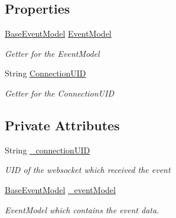 \subsection*{Properties}
\begin{DoxyCompactItemize}
\item 
\hyperlink{class_web_analyzer_1_1_models_1_1_event_model_1_1_base_event_model}{Base\+Event\+Model} \hyperlink{class_web_analyzer_1_1_events_1_1_add_browser_event_a4b3076f3d60100e7342be4da00a907fe}{Event\+Model}
\begin{DoxyCompactList}\small\item\em Getter for the Event\+Model \end{DoxyCompactList}\item 
String \hyperlink{class_web_analyzer_1_1_events_1_1_add_browser_event_a557993a53c4caa39aea3697db56cd0b5}{Connection\+U\+I\+D}
\begin{DoxyCompactList}\small\item\em Getter for the Connection\+U\+I\+D \end{DoxyCompactList}\end{DoxyCompactItemize}
\subsection*{Private Attributes}
\begin{DoxyCompactItemize}
\item 
String \hyperlink{class_web_analyzer_1_1_events_1_1_add_browser_event_ab10f41d4f0eb3043a6be0c1c1c5f96e8}{\+\_\+connection\+U\+I\+D}
\begin{DoxyCompactList}\small\item\em U\+I\+D of the websocket which received the event \end{DoxyCompactList}\item 
\hyperlink{class_web_analyzer_1_1_models_1_1_event_model_1_1_base_event_model}{Base\+Event\+Model} \hyperlink{class_web_analyzer_1_1_events_1_1_add_browser_event_a69a19a4ef8398fb9710d0d0f0a69ad1f}{\+\_\+event\+Model}
\begin{DoxyCompactList}\small\item\em Event\+Model which contains the event data. \end{DoxyCompactList}\end{DoxyCompactItemize}


